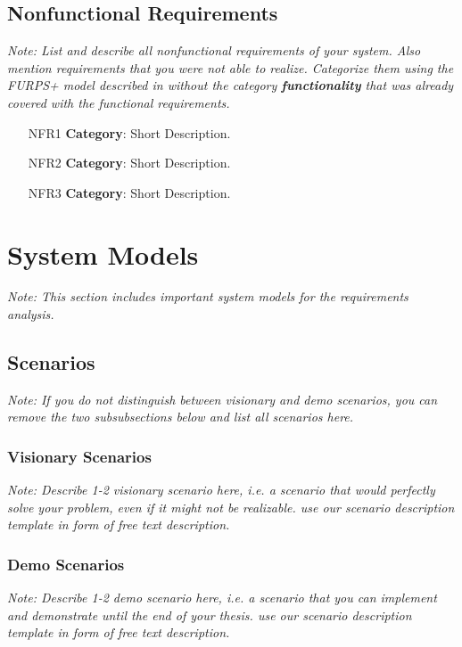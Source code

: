 \documentclass[a4paper,12pt,twoside]{report}
\begin{document}
\subsection{Nonfunctional Requirements}

\textit{Note: List and describe all nonfunctional requirements of your system. Also mention requirements that you were not able to realize. Categorize them using the FURPS+ model described in \cite{bruegge2004object} without the category \textbf{functionality} that was already covered with the functional requirements.}

\begin{itemize}
\item [NFR1] \textbf{Category}: Short Description.
\item [NFR2] \textbf{Category}: Short Description.
\item [NFR3] \textbf{Category}: Short Description.
\end{itemize}

\section{System Models}

\textit{Note: This section includes important system models for the requirements analysis.}

\subsection{Scenarios}

\textit{Note: If you do not distinguish between visionary and demo scenarios, you can remove the two subsubsections below and list all scenarios here.}

\subsubsection{Visionary Scenarios}

\textit{Note: Describe 1-2 visionary scenario here, i.e. a scenario that would perfectly solve your problem, even if it might not be realizable. use our scenario description template in form of free text description.}

\subsubsection{Demo Scenarios}

\textit{Note: Describe 1-2 demo scenario here, i.e. a scenario that you can implement and demonstrate until the end of your thesis. use our scenario description template in form of free text description.}
\end{document}
